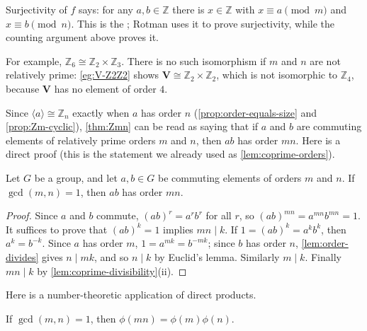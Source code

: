 \begin{remark}
	Surjectivity of \(f\) says: for any \(a, b \in \mathbb Z\) there is \(x \in \mathbb Z\)
	with \(x \equiv a \pmod m\) and \(x \equiv b \pmod n\). This is the ; Rotman uses it to prove surjectivity, while the counting argument
	above proves it.
\end{remark}

For example, \(\mathbb Z_6 \cong \mathbb Z_2 \times \mathbb Z_3\). There is no such
isomorphism if \(m\) and \(n\) are not relatively prime: \autoref{eg:V-Z2Z2} shows
\(\mathbf V \cong \mathbb Z_2 \times \mathbb Z_2\), which is not isomorphic to
\(\mathbb Z_4\), because \(\mathbf V\) has no element of order \(4\).

Since \(\langle a\rangle \cong \mathbb Z_n\) exactly when \(a\) has order \(n\)
(\autoref{prop:order-equals-size} and \autoref{prop:Zm-cyclic}), \autoref{thm:Zmn} can be read as saying that if \(a\) and \(b\)
are commuting elements of relatively prime orders \(m\) and \(n\), then \(ab\) has order
\(mn\). Here is a direct proof (this is the statement we already used as
\autoref{lem:coprime-orders}).

\begin{proposition}\label{prop:coprime-orders}
	Let \(G\) be a group, and let \(a, b \in G\) be commuting elements of orders \(m\) and
	\(n\). If \(\gcd(m, n) = 1\), then \(ab\) has order \(mn\).
\end{proposition}

\begin{proof}
	Since \(a\) and \(b\) commute, \((ab)^r = a^rb^r\) for all \(r\), so
	\((ab)^{mn} = a^{mn}b^{mn} = 1\). It suffices to prove that \((ab)^k = 1\) implies
	\(mn \mid k\). If \(1 = (ab)^k = a^kb^k\), then \(a^k = b^{-k}\). Since \(a\) has order
	\(m\), \(1 = a^{mk} = b^{-mk}\); since \(b\) has order \(n\), \autoref{lem:order-divides}
	gives \(n \mid mk\), and so \(n \mid k\) by Euclid's lemma. Similarly \(m \mid k\).
	Finally \(mn \mid k\) by \autoref{lem:coprime-divisibility}(ii).
\end{proof}

Here is a number-theoretic application of direct products.

\begin{corollary}\label{cor:phi-multiplicative}
	If \(\gcd(m, n) = 1\), then \(\phi(mn) = \phi(m)\phi(n)\).
\end{corollary}

